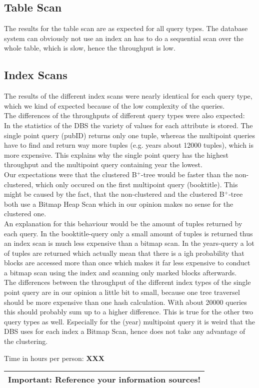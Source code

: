\documentclass[11pt]{scrartcl}
\begin{document}
\medskip

\subsection{Table Scan}
The results for the table scan are as expected for all query types. The database system can obviously not use an index an has to do a sequential scan over the whole table, which is slow, hence the throughput is low.
\subsection{Index Scans}
The results of the different index scans were nearly identical for each query type, which we kind of expected because of the low complexity of the queries.\\
The differences of the throughputs of different query types were also expected:\\
In the statistics of the DBS the variety of values for each attribute is stored. The single point query (pubID) returns only one tuple, whereas the multipoint queries have to find and return way more tuples (e.g. years about 12000 tuples), which is more expensive. This explains why the single point query has the highest throughput and the multipoint query containing year the lowest.\\
Our expectations were that the clustered B$^+$-tree would be faster than the non-clustered, which only occured on the first multipoint query (booktitle). This might be caused by the fact, that the non-clustered and the clustered B$^+$-tree both use a Bitmap Heap Scan which in our opinion makes no sense for the clustered one.\\
An explanation for this behaviour would be the amount of tuples returned by each query. In the booktitle-query only a small amount of tuples is returned thus an index scan is much less expensive than a bitmap scan. In the years-query a lot of tuples are returned which actually mean that there is a igh probability that blocks are accessed more than once which makes it far less expensive to conduct a bitmap scan using the index and scanning only marked blocks afterwards.\\ 
The differences between the throughput of the different index types of the single point query are in our opinion a little bit to small, because one tree traversel should be more expensive than one hash calculation. With about 20000 queries this should probably sum up to a higher difference. This is true for the other two query types as well. Especially for the (year) multipoint query it is weird that the DBS uses for each index a Bitmap Scan, hence does not take any advantage of the clustering.

\bigskip

\noindent Time in hours per person: {\bf XXX}

\bigskip

\begin{center}
  \begin{tabular}{c}
    \hline
    {\bf Important:} Reference your information sources!
    \\\hline
  \end{tabular}
\end{center}
\end{document}
